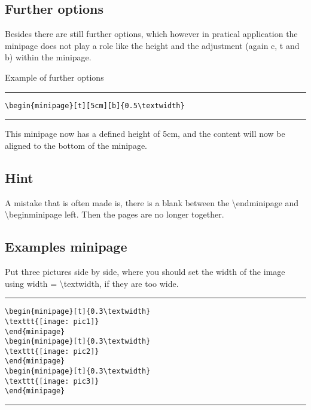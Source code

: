 \subsection{Further options}
Besides there are still further options, which however in pratical application the minipage does not play a role like the height and the adjustment (again c, t and b) within the minipage.

Example of further options
\noindent\vspace{1em}\hrule
\begin{verbatim}
\begin{minipage}[t][5cm][b]{0.5\textwidth}
\end{verbatim}
\noindent\hrule\vspace{1em}

This minipage now has a defined height of 5cm, and the content will now be aligned to the bottom of the minipage.

\subsection{Hint}
A mistake that is often made is, there is a blank between the \textbackslash end{minipage} and \textbackslash begin{minipage} left. Then the pages are no longer together.

\subsection{Examples minipage}
Put three pictures side by side, where you should set the width of the image using width = \textbackslash textwidth, if they are too wide.
\noindent\vspace{1em}\hrule
\begin{verbatim}
\begin{minipage}[t]{0.3\textwidth}
\texttt{[image: pic1]}
\end{minipage}
\begin{minipage}[t]{0.3\textwidth}
\texttt{[image: pic2]}
\end{minipage}
\begin{minipage}[t]{0.3\textwidth}
\texttt{[image: pic3]}
\end{minipage}
\end{verbatim}
\noindent\hrule\vspace{1em}

